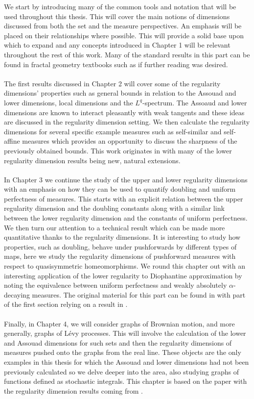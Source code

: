 We start by introducing many of the common tools and notation that will be used throughout this thesis. This will cover the main notions of dimensions discussed from both the set and the measure perspectives. An emphasis will be placed on their relationships where possible. This will provide a solid base upon which to expand and any concepts introduced in Chapter 1 will be relevant throughout the rest of this work. Many of the standard results in this part can be found in fractal geometry textbooks such as \cite{falconer} if further reading was desired.
\\ \\
The first results discussed in Chapter 2 will cover some of the regularity dimensions' properties such as general bounds in relation to the Assouad and lower dimensions, local dimensions and the $L^q$-spectrum. The Assoaud and lower dimensions are known to interact pleasantly with weak tangents and these ideas are discussed in the regularity dimension setting. We then calculate the regularity dimensions for several specific example measures such as self-similar and self-affine measures which provides an opportunity to discuss the sharpness of the previously obtained bounds. This work originates in \cite{fraser-howroyd2} with many of the lower regularity dimension results being new, natural extensions.
\\ \\
In Chapter 3 we continue the study of the upper and lower regularity dimensions with an emphasis on how they can be used to quantify doubling and uniform perfectness of measures. This starts with an explicit relation between the upper regularity dimension and the doubling constants along with a similar link between the lower regularity dimension and the constants of uniform perfectness. We then turn our attention to a technical result which can be made more quantitative thanks to the regularity dimensions. It is interesting to study how properties, such as doubling, behave under pushforwards by different types of maps, here we study the regularity dimensions of pushforward measures with respect to quasisymmetric homeomorphisms. We round this chapter out with an interesting application of the lower regularity to Diophantine approximation by noting the equivalence between uniform perfectness and weakly absolutely $\alpha$-decaying measures. The original material for this part can be found in \cite{howroyd} with part of the first section relying on a result in \cite{fraser-howroyd2}. 
\\ \\
Finally, in Chapter 4, we will consider graphs of Brownian motion, and more generally, graphs of L\'evy processes. This will involve the calculation of the lower and Assouad dimensions for such sets and then the regularity dimensions of measures pushed onto the graphs from the real line. These objects are the only examples in this thesis for which the Assouad and lower dimensions had not been previously calculated so we delve deeper into the area, also studying graphs of functions defined as stochastic integrals. This chapter is based on the paper \cite{howroyd-yu} with the regularity dimension results coming from \cite{howroyd}.






